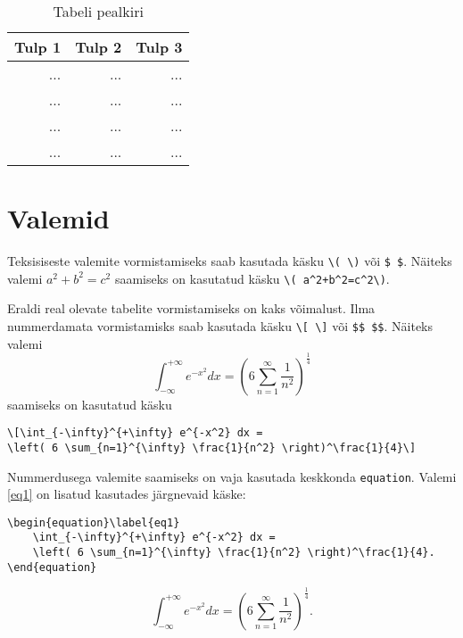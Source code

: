 \documentclass{trkut}%
\begin{document}
\begin{table}[htb]
    \caption{Tabeli pealkiri}%
    \label{tabel1}%
    \begin{tabular}{r|r|r}%
        \hline%
        Tulp 1 & Tulp 2 & Tulp 3 \\%
        \hline
        ... & ... & ... \\
        ... & ... & ... \\
        ... & ... & ... \\
        ... & ... & ... \\
        \hline
    \end{tabular}
\end{table}

\section{Valemid}
Teksisiseste valemite vormistamiseks saab kasutada käsku \verb!\( \)! või \verb!$ $!. Näiteks valemi \( a^2+b^2=c^2\) saamiseks on kasutatud käsku \verb!\( a^2+b^2=c^2\)!.

Eraldi real olevate tabelite vormistamiseks on kaks võimalust. Ilma nummerdamata vormistamisks saab kasutada käsku \verb!\[ \]! või \verb!$$ $$!. Näiteks valemi
\[\int_{-\infty}^{+\infty} e^{-x^2} dx = \left( 6 \sum_{n=1}^{\infty} \frac{1}{n^2} \right)^\frac{1}{4}\]
saamiseks on kasutatud käsku
\begin{verbatim}
\[\int_{-\infty}^{+\infty} e^{-x^2} dx =
\left( 6 \sum_{n=1}^{\infty} \frac{1}{n^2} \right)^\frac{1}{4}\]
\end{verbatim}

Nummerdusega valemite saamiseks on vaja kasutada keskkonda \verb!equation!. Valemi \ref{eq1} on lisatud kasutades järgnevaid käske:
\begin{verbatim}
\begin{equation}\label{eq1}
    \int_{-\infty}^{+\infty} e^{-x^2} dx =
    \left( 6 \sum_{n=1}^{\infty} \frac{1}{n^2} \right)^\frac{1}{4}.
\end{equation}
\end{verbatim}

\begin{equation}\label{eq1}
    \int_{-\infty}^{+\infty} e^{-x^2} dx = \left( 6 \sum_{n=1}^{\infty} \frac{1}{n^2} \right)^\frac{1}{4}.
\end{equation}
\end{document}
